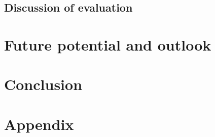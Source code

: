 \documentclass[12pt, a4paper]{article}
\begin{document}
    \subsection{Discussion of evaluation}
\section{Future potential and outlook}
\section{Conclusion}

\newpage
\renewcommand{\thesubsection}{\Alph{subsection}}
\setcounter{page}{\value{lastroman}}
\section*{Appendix}


\newpage


\newpage
\listoffigures





\end{document}
